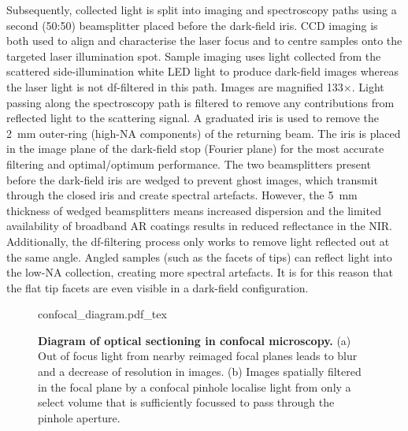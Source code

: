 \documentclass{article}
\begin{document}
Subsequently, collected light is split into imaging and spectroscopy paths using a second (50:50) beamsplitter placed before the dark-field iris.
CCD imaging is both used to align and characterise the laser focus and to centre samples onto the targeted laser illumination spot. Sample imaging uses light collected from the scattered side-illumination white LED light to produce dark-field images whereas the laser light is not \gls{df}-filtered in this path. Images are magnified 133$\times$.
Light passing along the spectroscopy path is filtered to remove any contributions from reflected light to the scattering signal. A graduated iris is used to remove the \SI{2}{mm} outer-ring (high-NA components) of the returning beam. The iris is placed in the image plane of the dark-field stop (Fourier plane) for the most accurate filtering and {\color{red}optimal/optimum} performance.
The two beamsplitters present before the dark-field iris are wedged to prevent ghost images, which transmit through the closed iris and create spectral artefacts. However, the \SI{5}{mm} thickness of wedged beamsplitters means increased dispersion and the limited availability of broadband AR coatings results in reduced reflectance in the NIR. %
Additionally, the \gls{df}-filtering process only works to remove light reflected out at the same angle. Angled samples (such as the facets of tips) can reflect light into the low-NA collection, creating more spectral artefacts. It is for this reason that the flat tip facets are even visible in a dark-field configuration.


\begin{figure}[bt]
\centering
\fontsize{10pt}{1em}\selectfont
{confocal_diagram.pdf_tex}
\caption[Diagram of optical sectioning in confocal microscopy]{\textbf{Diagram of optical sectioning in confocal microscopy.} (a) Out of focus light from nearby reimaged focal planes leads to blur and a decrease of resolution in images. (b) Images spatially filtered in the focal plane by a confocal pinhole localise light from only a select volume that is sufficiently focussed to pass through the pinhole aperture.}
\label{fig:confocal_diagram}
\end{figure}
\end{document}
